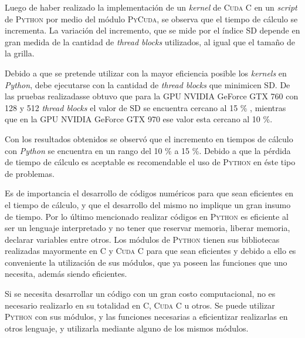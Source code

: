 
\newpage
Luego de haber realizado la implementación de un \textit{kernel} de \textsc{Cuda C} en un \textit{script} de \textsc{Python} por medio del módulo \textsc{PyCuda}, se observa que el tiempo de cálculo se incrementa. La variación del incremento, que se mide por el índice SD depende en gran medida de la cantidad de \textit{thread blocks} utilizados, al igual que el tamaño de la grilla.

Debido a que se pretende utilizar con la mayor eficiencia posible los \textit{kernels} en \textit{Python}, debe ejecutarse con la cantidad de \textit{thread blocks} que minimicen SD. De las pruebas realizadasse obtuvo que para la GPU NVIDIA GeForce GTX 760 con 128 y 512  \textit{thread blocks} el valor de SD se encuentra cercano al 15 \% , mientras que en la GPU NVIDIA GeForce GTX 970 ese valor esta cercano al 10 \%.

Con los resultados obtenidos se observó que el incremento en tiempos de cálculo con \textit{Python} se encuentra en un rango del 10 \% a 15 \%. Debido a que la pérdida de tiempo de cálculo es aceptable es recomendable el uso de \textsc{Python} en éste tipo de problemas. 

Es de importancia el desarrollo de códigos numéricos para que sean eficientes en el tiempo de cálculo, y que el desarrollo del mismo no implique un gran insumo de tiempo. Por lo último mencionado realizar códigos en \textsc{Python} es eficiente al ser un lenguaje interpretado y no tener que reservar memoria, liberar memoria, declarar variables entre otros. Los módulos de \textsc{Python} tienen sus bibliotecas realizadas mayormente en \textsc{C} y \textsc{Cuda C} para que sean eficientes y debido a ello es conveniente la utilización de sus módulos, que ya poseen las funciones que uno necesita, además siendo eficientes. 

Si se necesita desarrollar un código con un gran costo computacional, no es necesario realizarlo en su totalidad en \textsc{C}, \textsc{Cuda C} u otros. Se puede utilizar \textsc{Python} con sus módulos, y las funciones necesarias a eficientizar realizarlas en otros lenguaje, y utilizarla mediante alguno de los mismos módulos.






